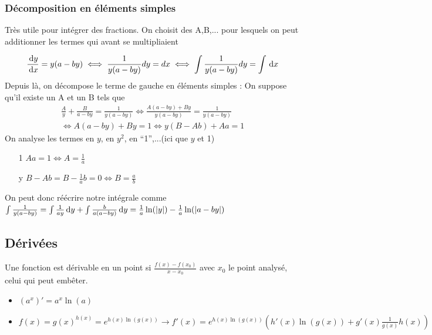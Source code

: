 \documentclass[12pt,a4paper]{article}
\renewcommand{\)}{\right)}
\renewcommand{\(}{\left(}
\begin{document}
\subsubsection{Décomposition en éléments simples}
\label{elements simples}
Très utile pour intégrer des fractions. On choisit des A,B,... pour lesquels on peut additionner les termes qui avant se multipliaient
\begin{exemple}[0.9]
\[\frac{\, \mathrm d y}{\, \mathrm d x} = y(a-by) \iff \frac{1}{y(a-by)}dy = dx \iff \int\frac{1}{y(a-by)}dy = \int \, \mathrm d x\] Depuis là, on décompose le terme de gauche en éléments simples : On suppose qu'il existe un A et un B tels que
\begin{align*}
	\frac{A}{y} + \frac{B}{a-by} = \frac{1}{y(a-by)} \iff \frac{A(a-by) + By}{y(a-by)} = \frac{1}{y(a-by)}\\
	 \iff A(a-by) + By = 1 \iff y(B -Ab) +Aa = 1
\end{align*}
On analyse les termes en $y$, en $y^2$, en \enquote{1},...(ici que $y$ et 1)
\begin{itemize}
	\item[1] $Aa = 1 \iff A = \frac{1}{a}$
	\item[y] $B-Ab = B-\frac{1}{a}b = 0 \iff B = \frac{a}{b}$
\end{itemize}
On peut donc réécrire notre intégrale comme $\int \frac{1}{y(a-by)} = \int \frac{1}{ay} \, \mathrm d y + \int \frac{b}{a(a-by)} \, \mathrm d y = \frac{1}{a}\ln(|y|) - \frac{1}{a}\ln(|a-by|)$
\end{exemple}


\subsection{Dérivées}
Une fonction est dérivable en un point si $\frac{f(x) - f(x_0)}{x-x_0}$ avec $x_0$ le point analysé, celui qui peut embêter.
\begin{itemize}
	\item $(a^x)' = a^x\ln(a)$
	\item $f(x) = g(x)^{h(x)} = e^{h(x) \ln(g(x))} \to f'(x) = e^{h(x)\ln(g(x))}\left(h'(x)\ln(g(x)) + g'(x)\frac{1}{g(x)}h(x)\right)$
\end{itemize}
\end{document}

